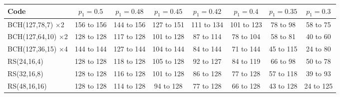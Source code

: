 \begin{tabular}{lccccccc}
\toprule
Code & $p_1=0.5$ & $p_1=0.48$ & $p_1=0.45$ & $p_1=0.42$ & $p_1=0.4$ & $p_1=0.35$ & $p_1=0.3$ \\
\midrule
BCH(127,78,7) $\times$2 & 156 to 156 & 144 to 156 & 127 to 151 & 111 to 134 & 101 to 123 & 78 to 98 & 58 to 75 \\
BCH(127,64,10) $\times$2 & 128 to 128 & 117 to 128 & 101 to 128 & 87 to 114 & 78 to 104 & 58 to 81 & 40 to 60 \\
BCH(127,36,15) $\times$4 & 144 to 144 & 127 to 144 & 104 to 144 & 84 to 144 & 71 to 144 & 45 to 115 & 24 to 80 \\
RS(24,16,4) & 128 to 128 & 118 to 128 & 105 to 128 & 92 to 127 & 84 to 119 & 66 to 98 & 50 to 78 \\
RS(32,16,8) & 128 to 128 & 116 to 128 & 101 to 128 & 86 to 128 & 77 to 128 & 57 to 118 & 39 to 93 \\
RS(48,16,16) & 128 to 128 & 114 to 128 & 94 to 128 & 77 to 128 & 66 to 128 & 43 to 128 & 24 to 125 \\
\bottomrule
\end{tabular}
